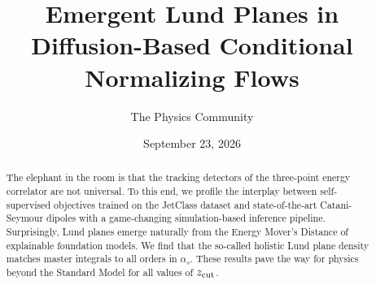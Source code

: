 \documentclass[11pt]{article}
\title{Emergent Lund Planes in Diffusion-Based Conditional Normalizing Flows}
\author{The Physics Community}
\date{September 23, 2026}
\numberwithin{equation}{section}
\theoremstyle{definition}
\theoremstyle{remark}
\begin{document}
\maketitle
\begin{abstract}
The elephant in the room is that the tracking detectors of the
three-point energy correlator are not universal. To this end, we profile
the interplay between self-supervised objectives trained on the JetClass
dataset and state-of-the-art Catani-Seymour dipoles with a game-changing
simulation-based inference pipeline. Surprisingly, Lund planes emerge
naturally from the Energy Mover's Distance of explainable foundation
models. We find that the so-called holistic Lund plane density matches
master integrals to all orders in $\alpha_s$. These results pave the way
for physics beyond the Standard Model for all values of $z_{\rm cut}$.
\end{abstract}
\tableofcontents





\nocite{*}


\end{document}
